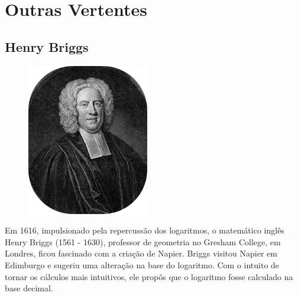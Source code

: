 \newpage
\section{Outras Vertentes}

\subsection{Henry Briggs}
\begin{figure}
    \setlength{\intextsep}{0pt}
    \vspace{-1.5em} 
    \centering
    \includegraphics[width=\linewidth]{img/briggs.png} 
\end{figure}

Em 1616, impulsionado pela repercussão dos logaritmos, o matemático inglês Henry Briggs (1561 - 1630), professor de geometria no Gresham College, em Londres, ficou fascinado com a criação de Napier. Briggs visitou Napier em Edimburgo e sugeriu uma alteração na base do logaritmo. Com o intuito de tornar os cálculos mais intuitivos, ele propôs que o logaritmo fosse calculado na base decimal.

